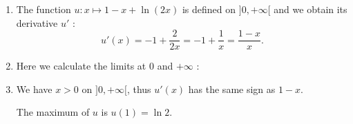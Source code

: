 \begin{enumerate}
	\item
	The function $u: x \mapsto 1-x + \ln (2x)$ is defined on $]0,+\infty[$ and we obtain
	its derivative $u'$ :
	\[u'(x)=-1+\frac{2}{2x}=-1+\frac{1}{x}=\frac{1-x}{x}. \]

	\item
	Here we calculate the limits at 0 and $+\infty$ :

	\item
	We have $x >0$ on $]0,+\infty[$, thus $u'(x)$ has the same sign as $1-x$.

	The maximum of $u$ is $u(1)=\ln2$.

\end{enumerate}
